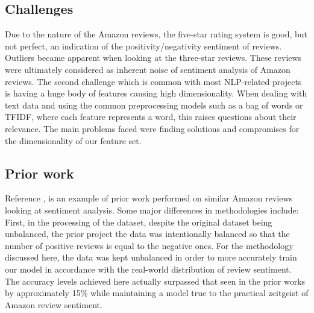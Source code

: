 \documentclass[conference , 11pt]{IEEEtran}
\begin{document}
\subsection{Challenges}\label{AA}
Due to the nature of the Amazon reviews, the five-star rating system is good, but not perfect, an indication of the positivity/negativity sentiment of reviews. Outliers became apparent when looking at the three-star reviews. These reviews were ultimately considered as inherent noise of sentiment analysis of Amazon reviews. The second challenge which is common with most NLP-related projects is having a huge body of features causing high dimensionality. When dealing with text data and using the common preprocessing models such as a bag of words or TFIDF, where each feature represents a word, this raises questions about their relevance. The main problems faced were finding solutions and compromises for the dimensionality of our feature set.

\subsection{Prior work}
Reference \cite{priorwork}, is an example of prior work performed on similar Amazon reviews looking at sentiment analysis. Some major differences in methodologies include: First, in the processing of the dataset, despite the original dataset being unbalanced, the prior project the data was intentionally balanced so that the number of positive reviews is equal to the negative ones. For the methodology discussed here, the data was kept unbalanced in order to more accurately train our model in accordance with the real-world distribution of review sentiment. The accuracy levels achieved here actually surpassed that seen in the prior works by approximately 15\% while maintaining a model true to the practical zeitgeist of Amazon review sentiment.
\end{document}

